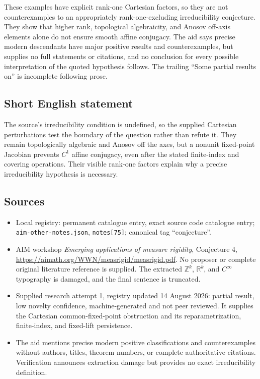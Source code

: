\documentclass[11pt]{article}
\newcommand{\Z}{\mathbb{Z}}
\newcommand{\R}{\mathbb{R}}
\begin{document}
These examples have explicit rank-one Cartesian factors, so they are not counterexamples to an appropriately rank-one-excluding irreducibility conjecture. They show that higher rank, topological algebraicity, and Anosov off-axis elements alone do not ensure smooth affine conjugacy. The aid says precise modern descendants have major positive results and counterexamples, but supplies no full statements or citations, and no conclusion for every possible interpretation of the quoted hypothesis follows. The trailing ``Some partial results on'' is incomplete following prose.
\subsection{Short English statement}
The source's irreducibility condition is undefined, so the supplied Cartesian perturbations test the boundary of the question rather than refute it. They remain topologically algebraic and Anosov off the axes, but a nonunit fixed-point Jacobian prevents $C^1$ affine conjugacy, even after the stated finite-index and covering operations. Their visible rank-one factors explain why a precise irreducibility hypothesis is necessary.
\subsection{Sources}
\begin{itemize}
\item Local registry: permanent catalogue entry, exact source code catalogue entry; \texttt{aim-other-notes.json}, \texttt{notes[75]}; canonical tag ``conjecture''.
\item AIM workshop \emph{Emerging applications of measure rigidity}, Conjecture 4, \url{https://aimath.org/WWN/measrigid/measrigid.pdf}. No proposer or complete original literature reference is supplied. The extracted $\Z^k$, $\R^k$, and $C^\infty$ typography is damaged, and the final sentence is truncated.
\item Supplied research attempt 1, registry updated 14 August 2026: partial result, low novelty confidence, machine-generated and not peer reviewed. It supplies the Cartesian common-fixed-point obstruction and its reparametrization, finite-index, and fixed-lift persistence.
\item The aid mentions precise modern positive classifications and counterexamples without authors, titles, theorem numbers, or complete authoritative citations. Verification announces extraction damage but provides no exact irreducibility definition.
\end{itemize}
\end{document}
